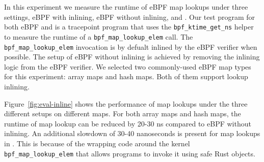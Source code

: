 In this experiment we measure the runtime of eBPF map lookups under three
    settings, eBPF with inlining, eBPF without inlining, and \projname{}.
Our test program for both eBPF and \projname{} is a tracepoint program that
    uses the \texttt{bpf\_ktime\_get\_ns} helper to measure the runtime of
    a \texttt{bpf\_map\_lookup\_elem} call.
The \texttt{bpf\_map\_lookup\_elem} invocation is by defualt inlined by the
    eBPF verifier when possible.
The setup of eBPF without inlining is achieved by removing the inlining logic
    from the eBPF verifier.
We selected two commonly-used eBPF map types for this experiment: array maps
    and hash maps.
Both of them support lookup inlining.

Figure~\ref{fig:eval-inline} shows the performance of map lookups under the
    three different setups on different maps.
For both array maps and hash maps, the
    runtime of map lookup can be reduced by 20-30 ns compared to eBPF without
    inlining.
An additional slowdown of 30-40 nanoseconds is present for map lookups in
    \projname{}.
This is because of the wrapping code around the kernel
    \texttt{bpf\_map\_lookup\_elem} that allows \projname{} programs to invoke
    it using safe Rust objects.



